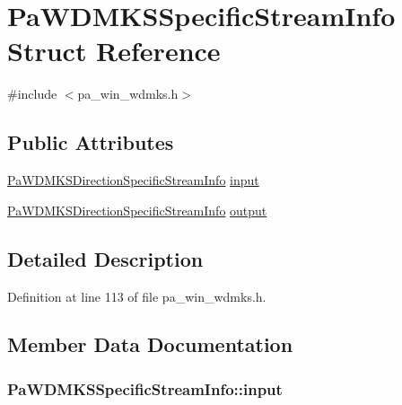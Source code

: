 \hypertarget{struct_pa_w_d_m_k_s_specific_stream_info}{}\section{Pa\+W\+D\+M\+K\+S\+Specific\+Stream\+Info Struct Reference}
\label{struct_pa_w_d_m_k_s_specific_stream_info}


{\ttfamily \#include $<$pa\+\_\+win\+\_\+wdmks.\+h$>$}

\subsection*{Public Attributes}
\begin{DoxyCompactItemize}
\item 
\hyperlink{struct_pa_w_d_m_k_s_direction_specific_stream_info}{Pa\+W\+D\+M\+K\+S\+Direction\+Specific\+Stream\+Info} \hyperlink{struct_pa_w_d_m_k_s_specific_stream_info_addb405c49554ab4c9e11122f4b85d384}{input}
\item 
\hyperlink{struct_pa_w_d_m_k_s_direction_specific_stream_info}{Pa\+W\+D\+M\+K\+S\+Direction\+Specific\+Stream\+Info} \hyperlink{struct_pa_w_d_m_k_s_specific_stream_info_a99f218f86f2ee9c1f56ae657e1de62cb}{output}
\end{DoxyCompactItemize}


\subsection{Detailed Description}


Definition at line 113 of file pa\+\_\+win\+\_\+wdmks.\+h.



\subsection{Member Data Documentation}
\subsubsection[{\texorpdfstring{input}{input}}]{ Pa\+W\+D\+M\+K\+S\+Specific\+Stream\+Info\+::input}\hypertarget{struct_pa_w_d_m_k_s_specific_stream_info_addb405c49554ab4c9e11122f4b85d384}{}\label{struct_pa_w_d_m_k_s_specific_stream_info_addb405c49554ab4c9e11122f4b85d384}


